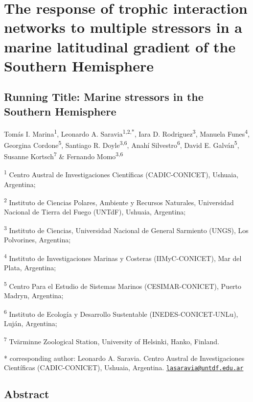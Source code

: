 \documentclass[
]{article}
\author{}
\date{\vspace{-2.5em}}
\begin{document}
\section{The response of trophic interaction networks to multiple
stressors in a marine latitudinal gradient of the Southern
Hemisphere}\label{the-response-of-trophic-interaction-networks-to-multiple-stressors-in-a-marine-latitudinal-gradient-of-the-southern-hemisphere}

\subsection{Running Title: Marine stressors in the Southern
Hemisphere}\label{running-title-marine-stressors-in-the-southern-hemisphere}

Tomás I. Marina\textsuperscript{1}, Leonardo A.
Saravia\textsuperscript{1,2,*}, Iara D. Rodriguez\textsuperscript{3},
Manuela Funes\textsuperscript{4}, Georgina Cordone\textsuperscript{5},
Santiago R. Doyle\textsuperscript{3,6}, Anahí
Silvestro\textsuperscript{6}, David E. Galván\textsuperscript{5},
Susanne Kortsch\textsuperscript{7} \& Fernando Momo\textsuperscript{3,6}

\textsuperscript{1} Centro Austral de Investigaciones Científicas
(CADIC-CONICET), Ushuaia, Argentina;

\textsuperscript{2} Instituto de Ciencias Polares, Ambiente y Recursos
Naturales, Universidad Nacional de Tierra del Fuego (UNTdF), Ushuaia,
Argentina;

\textsuperscript{3} Instituto de Ciencias, Universidad Nacional de
General Sarmiento (UNGS), Los Polvorines, Argentina;

\textsuperscript{4} Instituto de Investigaciones Marinas y Costeras
(IIMyC-CONICET), Mar del Plata, Argentina;

\textsuperscript{5} Centro Para el Estudio de Sistemas Marinos
(CESIMAR-CONICET), Puerto Madryn, Argentina;

\textsuperscript{6} Instituto de Ecología y Desarrollo Sustentable
(INEDES-CONICET-UNLu), Luján, Argentina;

\textsuperscript{7} Tvärminne Zoological Station, University of
Helsinki, Hanko, Finland.

* corresponding author: Leonardo A. Saravia. Centro Austral de
Investigaciones Científicas (CADIC-CONICET), Ushuaia, Argentina.
\href{mailto:lasaravia@untdf.edu.ar}{\nolinkurl{lasaravia@untdf.edu.ar}}

\subsection{Abstract}\label{abstract}
\end{document}
